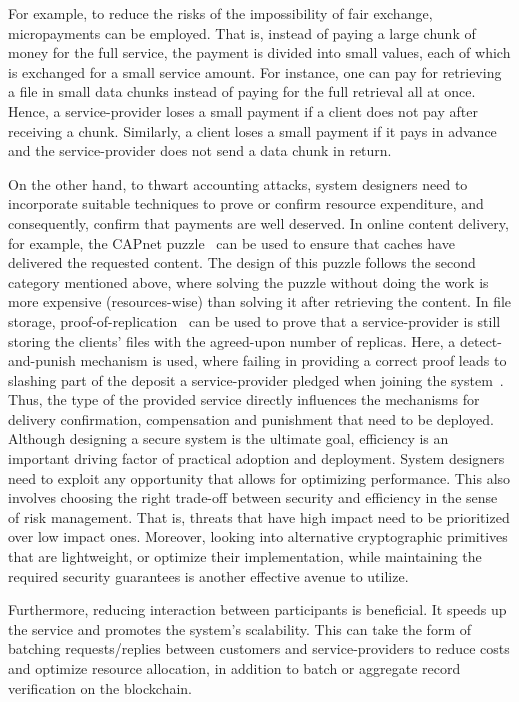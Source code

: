 \documentclass{llncs}
\begin{document}
For example, to reduce the risks of the impossibility of fair exchange, micropayments can be employed. That is, instead of paying a large chunk of money for the full service, the payment is divided into small values, each of which is exchanged for a small service amount. For instance, one can pay for retrieving a file in small data chunks instead of paying for the full retrieval all at once. Hence, a service-provider loses a small payment if a client does not pay after receiving a chunk. Similarly, a client loses a small payment if it pays in advance and the service-provider does not send a data chunk in return.


On the other hand, to thwart accounting attacks, system designers need to incorporate suitable techniques to prove or confirm resource expenditure, and consequently, confirm that payments are well deserved. In online content delivery, for example, the CAPnet puzzle~\cite{Almashaqbeh19b} can be used to ensure that caches have delivered the requested content. The design of this puzzle follows the second category mentioned above, where solving the puzzle without doing the work is more expensive (resources-wise) than solving it after retrieving the content. In file storage, proof-of-replication~\cite{Fisch19} can be used to prove that a service-provider is still storing the clients’ files with the agreed-upon number of replicas. Here, a detect-and-punish mechanism is used, where failing in providing a correct proof leads to slashing part of the deposit a service-provider pledged when joining the system~\cite{filecoin}. Thus, the type of the provided service directly influences the mechanisms for delivery confirmation, compensation and punishment that need to be deployed. \\


 Although designing a secure system is the ultimate goal, efficiency is an important driving factor of practical adoption and deployment. System designers need to exploit any opportunity that allows for optimizing performance. This also involves choosing the right trade-off between security and efficiency in the sense of risk management. That is, threats that have high impact need to be prioritized over low impact ones. Moreover, looking into alternative cryptographic primitives that are lightweight, or optimize their implementation, while maintaining the required security guarantees is another effective avenue to utilize.


Furthermore, reducing interaction between participants is beneficial. It speeds up the service and promotes the system’s scalability. This can take the form of batching requests/replies between customers and service-providers to reduce costs and optimize resource allocation, in addition to batch or aggregate record verification on the blockchain.
\end{document}
